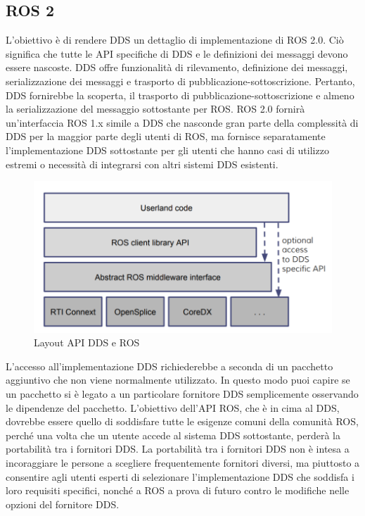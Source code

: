 \documentclass[a4paper]{article}
\begin{document}
\subsection{ROS 2}
L'obiettivo è di rendere DDS un dettaglio di implementazione di ROS 2.0. Ciò significa che tutte le API specifiche di DDS e le definizioni dei messaggi devono essere nascoste. DDS offre funzionalità di rilevamento, definizione dei messaggi, serializzazione dei messaggi e trasporto di pubblicazione-sottoscrizione. Pertanto, DDS fornirebbe la scoperta, il trasporto di pubblicazione-sottoscrizione e almeno la serializzazione del messaggio sottostante per ROS. ROS 2.0 fornirà un'interfaccia ROS 1.x simile a DDS che nasconde gran parte della complessità di DDS per la maggior parte degli utenti di ROS, ma fornisce  separatamente l'implementazione DDS sottostante per gli utenti che hanno casi di utilizzo estremi o necessità di integrarsi con altri sistemi DDS esistenti.

\begin{figure}[htbp]
\centering
\includegraphics[scale=0.5]{dds_img.PNG} 
\caption{Layout API DDS e ROS}
\end{figure}


L'accesso all'implementazione DDS richiederebbe a seconda di un pacchetto aggiuntivo che non viene normalmente utilizzato. In questo modo puoi capire se un pacchetto si è legato a un particolare fornitore DDS semplicemente osservando le dipendenze del pacchetto. L'obiettivo dell'API ROS, che è in cima al DDS, dovrebbe essere quello di soddisfare tutte le esigenze comuni della comunità ROS, perché una volta che un utente accede al sistema DDS sottostante, perderà la portabilità tra i fornitori DDS. La portabilità tra i fornitori DDS non è intesa a incoraggiare le persone a scegliere frequentemente fornitori diversi, ma piuttosto a consentire agli utenti esperti di selezionare l'implementazione DDS che soddisfa i loro requisiti specifici, nonché a ROS a prova di futuro contro le modifiche nelle opzioni del fornitore DDS.
\end{document}
